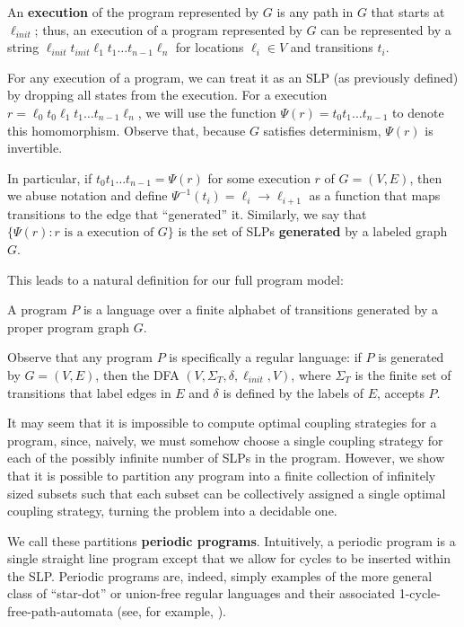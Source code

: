 An \textbf{execution} of the program represented by $G$ is any path in $G$ that starts at $\ell_{init}$; thus, an execution of a program represented by $G$ can be represented by a string $\ell_{init}t_{init}\ell_1t_1\ldots t_{n-1}\ell_n$ for locations $\ell_i\in V$ and transitions $t_i$.

For any execution of a program, we can treat it as an SLP (as previously defined) by dropping all states from the execution. For a execution $r=\ell_0t_0\ell_1t_1\ldots t_{n-1}\ell_n$, we will use the function $\Psi(r) = t_0t_1\ldots t_{n-1}$ to denote this homomorphism. Observe that, because $G$ satisfies determinism, $\Psi(r)$ is invertible. 

In particular, if $t_0t_1\ldots t_{n-1} = \Psi(r)$ for some execution $r$ of $G = (V, E)$, then we abuse notation and define $\Psi^{-1}(t_i) = \ell_i\to\ell_{i+1}$ as a function that maps transitions to the edge that ``generated'' it. Similarly, we say that $\{\Psi(r): r\text{ is a execution of }G\}$ is the set of SLPs \textbf{generated} by a labeled graph $G$. 

This leads to a natural definition for our full program model: 
\begin{defn}[Programs]
    A program $P$ is a language over a finite alphabet of transitions generated by a proper program graph $G$.
\end{defn}

Observe that any program $P$ is specifically a regular language: if $P$ is generated by $G = (V, E)$, then the DFA $(V, \Sigma_T, \delta, \ell_{init}, V)$, where $\Sigma_T$ is the finite set of transitions that label edges in $E$ and $\delta$ is defined by the labels of $E$, accepts $P$.

It may seem that it is impossible to compute optimal coupling strategies for a program, since, naively, we must somehow choose a single coupling strategy for each of the possibly infinite number of SLPs in the program. However, we show that it is possible to partition any program into a finite collection of infinitely sized subsets such that each subset can be collectively assigned a single optimal coupling strategy, turning the problem into a decidable one.

We call these partitions \textbf{periodic programs}.
Intuitively, a periodic program is a single straight line program except that we allow for cycles to be inserted within the SLP. Periodic programs are, indeed, simply examples of the more general class of ``star-dot'' or union-free regular languages and their associated 1-cycle-free-path-automata (see, for example, \cite{nagyUnionfreeRegularLanguages2006}).


